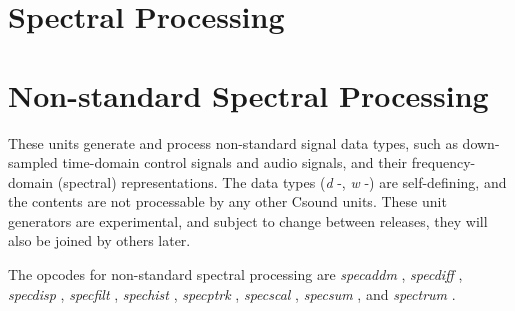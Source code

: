 \begin{comment}
\documentclass[10pt]{article}
\usepackage{fullpage, graphicx, url}
\setlength{\parskip}{1ex}
\setlength{\parindent}{0ex}
\title{Spectral Processing}



\begin{tabular}{ccc}
The Alternative Csound Reference Manual & & \\
Previous & &Next

\end{tabular}

\end{comment}
\section{Spectral Processing}
\section{Non-standard Spectral Processing}


  These units generate and process non-standard signal data types, such as down-sampled time-domain control signals and audio signals, and their frequency-domain (spectral) representations. The data types (\emph{d}
-, \emph{w}
-) are self-defining, and the contents are not processable by any other Csound units. These unit generators are experimental, and subject to change between releases, they will also be joined by others later. 


  The opcodes for non-standard spectral processing are \emph{specaddm}
, \emph{specdiff}
, \emph{specdisp}
, \emph{specfilt}
, \emph{spechist}
, \emph{specptrk}
, \emph{specscal}
, \emph{specsum}
, and \emph{spectrum}
. 


\begin{comment}
\begin{tabular}{lcr}
Previous &Home &Next \\
Waveguides &Up &Tools for Real-time Spectral Processing

\end{tabular}



\end{comment}

